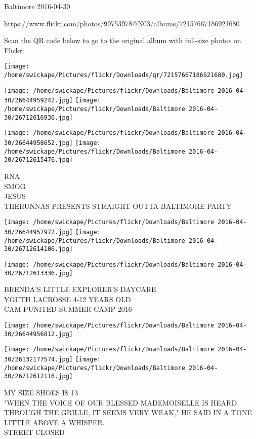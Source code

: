 \documentclass[10pt,letterpaper]{article}
\begin{document}
Baltimore 2016-04-30

https://www.flickr.com/photos/99753978@N03/albums/72157667186921680

Scan the QR code below to go to the original album with full-size photos on Flickr:

\texttt{[image: /home/swickape/Pictures/flickr/Downloads/qr/72157667186921680.jpg]}
\pagebreak

\texttt{[image: /home/swickape/Pictures/flickr/Downloads/Baltimore 2016-04-30/26644959242.jpg]}
\texttt{[image: /home/swickape/Pictures/flickr/Downloads/Baltimore 2016-04-30/26712616936.jpg]}

\texttt{[image: /home/swickape/Pictures/flickr/Downloads/Baltimore 2016-04-30/26644958652.jpg]}
\texttt{[image: /home/swickape/Pictures/flickr/Downloads/Baltimore 2016-04-30/26712615476.jpg]}

RNA\\
SMOG\\
JESUS\\
THERUNNAS PRESENTS STRAIGHT OUTTA BALTIMORE PARTY
\pagebreak

\texttt{[image: /home/swickape/Pictures/flickr/Downloads/Baltimore 2016-04-30/26644957972.jpg]}
\texttt{[image: /home/swickape/Pictures/flickr/Downloads/Baltimore 2016-04-30/26712614106.jpg]}

\texttt{[image: /home/swickape/Pictures/flickr/Downloads/Baltimore 2016-04-30/26712613336.jpg]}

BRENDA'S LITTLE EXPLORER'S DAYCARE\\
YOUTH LACROSSE 4{-}12 YEARS OLD\\
CAM PUNITED SUMMER CAMP 2016
\pagebreak

\texttt{[image: /home/swickape/Pictures/flickr/Downloads/Baltimore 2016-04-30/26644956812.jpg]}

\vspace{0.25in}
\texttt{[image: /home/swickape/Pictures/flickr/Downloads/Baltimore 2016-04-30/26132177574.jpg]}
\texttt{[image: /home/swickape/Pictures/flickr/Downloads/Baltimore 2016-04-30/26712612116.jpg]}

MY SIZE SHOES IS 13\\
"WHEN THE VOICE OF OUR BLESSED MADEMOISELLE IS HEARD THROUGH THE GRILLE, IT SEEMS VERY WEAK," HE SAID IN A TONE LITTLE ABOVE A WHISPER.\\
STREET CLOSED
\pagebreak
\end{document}
